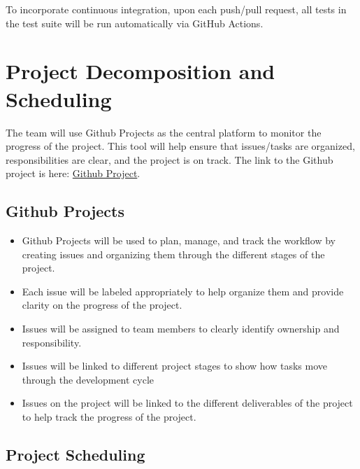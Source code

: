 \documentclass{article}
\begin{document}
To incorporate continuous integration, upon each push/pull request, all tests in the test suite
will be run automatically via GitHub Actions.

\section{Project Decomposition and Scheduling}

\iffalse
\begin{itemize}
  \item How will you be using GitHub projects?
  \item Include a link to your GitHub project
\end{itemize}

\wss{How will the project be scheduled?  This is the big picture schedule, not
details. You will need to reproduce information that is in the course outline
for deadlines.}
\fi

The team will use Github Projects as the central platform to monitor the progress of the project. This tool will help ensure that issues/tasks are organized, responsibilities are clear, and the project is on track. The link to the Github project is here: \href{https://github.com/users/OmarHassanAdelhamid/projects/2/views/1}{Github Project}.

\subsection{Github Projects}
\begin{itemize}
  \item Github Projects will be used to plan, manage, and track the workflow by creating issues and organizing them through the different stages of the project.
  \item Each issue will be labeled appropriately to help organize them and provide clarity on the progress of the project.
  \item Issues will be assigned to team members to clearly identify ownership and responsibility.
  \item Issues will be linked to different project stages to show how tasks move through the development cycle
  \item Issues on the project will be linked to the different deliverables of the project to help track the progress of the project.
\end{itemize}

\subsection{Project Scheduling}
\end{document}
